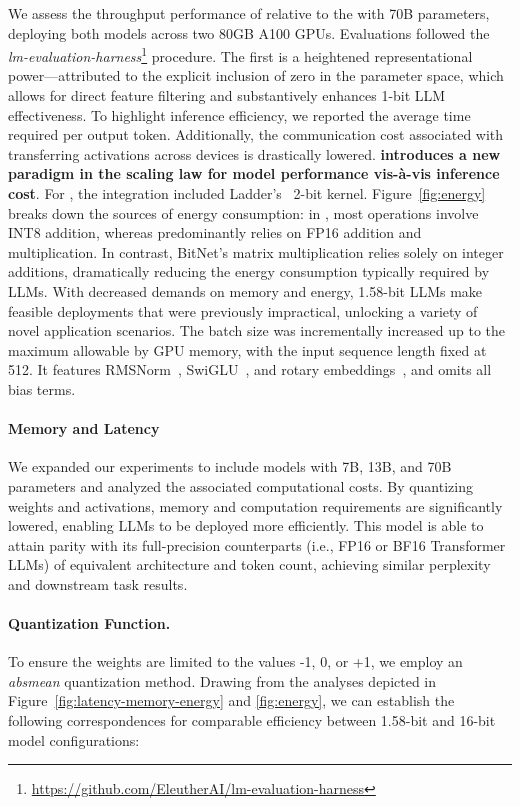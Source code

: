 We assess the throughput performance of  relative to the  with 70B parameters, deploying both models across two 80GB A100 GPUs. Evaluations followed the \emph{lm-evaluation-harness}\footnote{\url{https://github.com/EleutherAI/lm-evaluation-harness}} procedure. The first is a heightened representational power—attributed to the explicit inclusion of zero in the parameter space, which allows for direct feature filtering and substantively enhances 1-bit LLM effectiveness. To highlight inference efficiency, we reported the average time required per output token. Additionally, the communication cost associated with transferring activations across devices is drastically lowered. \textbf{ introduces a new paradigm in the scaling law for model performance vis-à-vis inference cost}. For , the integration included Ladder's~\cite{ladder} 2-bit kernel. Figure~\ref{fig:energy} breaks down the sources of energy consumption: in , most operations involve INT8 addition, whereas  predominantly relies on FP16 addition and multiplication. In contrast, BitNet’s matrix multiplication relies solely on integer additions, dramatically reducing the energy consumption typically required by LLMs. With decreased demands on memory and energy, 1.58-bit LLMs make feasible deployments that were previously impractical, unlocking a variety of novel application scenarios. The batch size was incrementally increased up to the maximum allowable by GPU memory, with the input sequence length fixed at 512. It features RMSNorm~\cite{rmsnorm}, SwiGLU~\cite{swiglu}, and rotary embeddings~\cite{rope}, and omits all bias terms. \paragraph{Memory and Latency}

We expanded our experiments to include models with 7B, 13B, and 70B parameters and analyzed the associated computational costs. By quantizing weights and activations, memory and computation requirements are significantly lowered, enabling LLMs to be deployed more efficiently. This model is able to attain parity with its full-precision counterparts (i.e., FP16 or BF16 Transformer LLMs) of equivalent architecture and token count, achieving similar perplexity and downstream task results. \paragraph{Quantization Function.} To ensure the weights are limited to the values -1, 0, or +1, we employ an \emph{absmean} quantization method. Drawing from the analyses depicted in Figure~\ref{fig:latency-memory-energy} and \ref{fig:energy}, we can establish the following correspondences for comparable efficiency between 1.58-bit and 16-bit model configurations:

